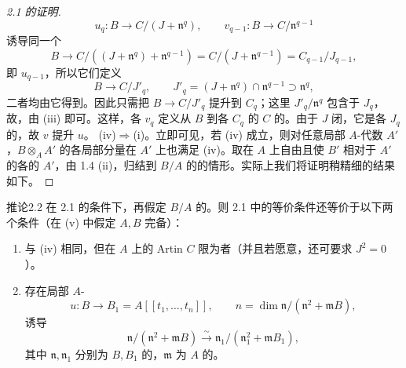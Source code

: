 \begin{proof}[2.1 的证明]
\[u_q:B\to C/(J+\mathfrak n^q),\qquad v_{q-1}:B\to C/\mathfrak n^{q-1}\]
诱导同一个
\[B\to C/((J+\mathfrak n^q)+\mathfrak n^{q-1})=C/(J+\mathfrak n^{q-1})=C_{q-1}/J_{q-1},\]
即 $u_{q-1}$，所以它们定义
\[B\to C/J'_q,\qquad J'_q=(J+\mathfrak n^q)\cap\mathfrak n^{q-1}\supset\mathfrak n^q,\]
二者均由它得到。因此只需把 $B\to C/J'_q$ 提升到 $C_q$；这里 $J'_q/\mathfrak n^q$ 包含于 $J_q$，故，由 (iii) 即可。这样，各 $v_q$ 定义从 $B$ 到各 $C_q$ 的 $C$ 的。由于 $J$ 闭，它是各 $J_q$ 的，故 $v$ 提升 $u$。
(iv)$\Rightarrow$(i)。立即可见，若 (iv) 成立，则对任意局部 $A$-代数 $A'$，$B\otimes_A A'$ 的各局部分量在 $A'$ 上也满足 (iv)。取在 $A$ 上自由且使 $B'$ 相对于 $A'$ 的各的 $A'$，由 1.4 (ii)，归结到 $B/A$ 的的情形。实际上我们将证明稍精细的结果如下。
\end{proof}
\begin{SGAresult}{推论}{2.2}
在 2.1 的条件下，再假定 $B/A$ 的。则 2.1 中的等价条件还等价于以下两个条件（在 (v) 中假定 $A,B$ 完备）：
\begin{enumerate}
\item[(iv ter)] 与 (iv) 相同，但在 $A$ 上的 Artin  $C$ 限为者（并且若愿意，还可要求 $J^2=0$）。
\item[(v)] 存在局部 $A$-
\[u:B\to B_1=A[[t_1,\ldots,t_n]],\qquad n=\dim\mathfrak n/(\mathfrak n^2+\mathfrak mB),\]
诱导
\[\mathfrak n/(\mathfrak n^2+\mathfrak mB)\xrightarrow{\sim}\mathfrak n_1/(\mathfrak n_1^2+\mathfrak mB_1),\]
其中 $\mathfrak n,\mathfrak n_1$ 分别为 $B,B_1$ 的，$\mathfrak m$ 为 $A$ 的。
\end{enumerate}
\end{SGAresult}
